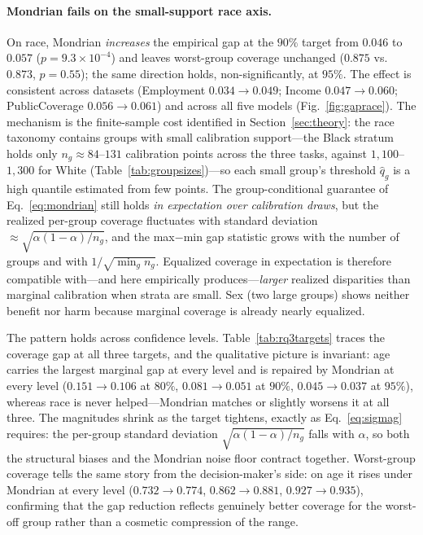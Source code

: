 \documentclass[review,12pt]{elsarticle}
\begin{document}
\paragraph{Mondrian fails on the small-support race axis.}
On race, Mondrian \emph{increases} the empirical gap at the $90\%$ target from $0.046$ to $0.057$ ($p=9.3\times10^{-4}$) and leaves worst-group coverage unchanged ($0.875$ vs.\ $0.873$, $p=0.55$); the same direction holds, non-significantly, at $95\%$. The effect is consistent across datasets (Employment $0.034 \to 0.049$; Income $0.047 \to 0.060$; PublicCoverage $0.056 \to 0.061$) and across all five models (Fig.~\ref{fig:gaprace}). The mechanism is the finite-sample cost identified in Section~\ref{sec:theory}: the race taxonomy contains groups with small calibration support---the Black stratum holds only $n_g \approx 84$--$131$ calibration points across the three tasks, against $1{,}100$--$1{,}300$ for White (Table~\ref{tab:groupsizes})---so each small group's threshold $\hat q_g$ is a high quantile estimated from few points. The group-conditional guarantee of Eq.~\eqref{eq:mondrian} still holds \emph{in expectation over calibration draws}, but the realized per-group coverage fluctuates with standard deviation $\approx \sqrt{\alpha(1-\alpha)/n_g}$, and the max$-$min gap statistic grows with the number of groups and with $1/\sqrt{\min_g n_g}$. Equalized coverage in expectation is therefore compatible with---and here empirically produces---\emph{larger} realized disparities than marginal calibration when strata are small. Sex (two large groups) shows neither benefit nor harm because marginal coverage is already nearly equalized.

The pattern holds across confidence levels. Table~\ref{tab:rq3targets} traces the coverage gap at all three targets, and the qualitative picture is invariant: age carries the largest marginal gap at every level and is repaired by Mondrian at every level ($0.151\!\to\!0.106$ at $80\%$, $0.081\!\to\!0.051$ at $90\%$, $0.045\!\to\!0.037$ at $95\%$), whereas race is never helped---Mondrian matches or slightly worsens it at all three. The magnitudes shrink as the target tightens, exactly as Eq.~\eqref{eq:sigmag} requires: the per-group standard deviation $\sqrt{\alpha(1-\alpha)/n_g}$ falls with $\alpha$, so both the structural biases and the Mondrian noise floor contract together. Worst-group coverage tells the same story from the decision-maker's side: on age it rises under Mondrian at every level ($0.732\!\to\!0.774$, $0.862\!\to\!0.881$, $0.927\!\to\!0.935$), confirming that the gap reduction reflects genuinely better coverage for the worst-off group rather than a cosmetic compression of the range.
\end{document}
